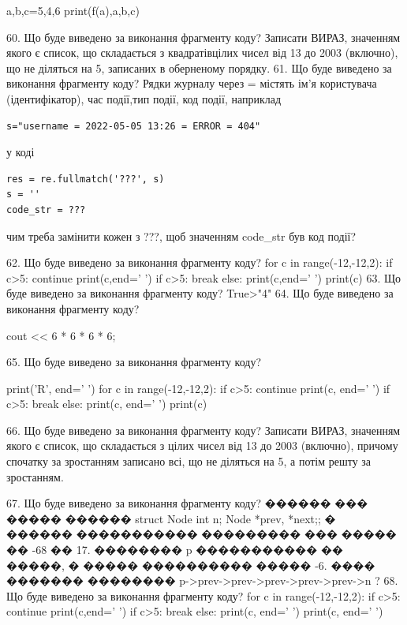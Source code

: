 \documentclass[11pt]{article}
\begin{document}
a,b,c=5,4,6
print(f(a),a,b,c)

60. Що буде виведено за виконання фрагменту коду?
Записати ВИРАЗ, значенням якого є список, що складається з квадратівцілих чисел від 13 до 2003 (включно), що не діляться на 5, записаних в оберненому порядку.
61. Що буде виведено за виконання фрагменту коду?
Рядки журналу через = містять ім'я користувача (ідентифікатор), час події,тип події, код події, наприклад
\begin{verbatim}
s="username = 2022-05-05 13:26 = ERROR = 404"
\end{verbatim}
у коді 
\begin{verbatim}
res = re.fullmatch('???', s) 
s = ''
code_str = ??? 
\end{verbatim}
чим треба замінити кожен з ???, щоб значенням code\_str був код події? 



62. Що буде виведено за виконання фрагменту коду?
for c in range(-12,-12,2):
     if c>5: continue
     print(c,end=' ')
     if c>5: break
   else: print(c,end=' ')
   print(c)
63. Що буде виведено за виконання фрагменту коду?
True>"4"
64. Що буде виведено за виконання фрагменту коду?

cout << 6 * 6 * 6 * 6;

65. Що буде виведено за виконання фрагменту коду?

print('R', end=' ')
for c in range(-12,-12,2):
    if c>5:
        continue
        print(c, end=' ')
    if c>5:
        break
    else:
        print(c, end=' ')
    print(c)

66. Що буде виведено за виконання фрагменту коду?
Записати ВИРАЗ, значенням якого є список, що складається з цілих чисел від 13 до 2003 (включно), причому спочатку за зростанням записано всі, що не діляться на 5, а потім решту за зростанням.

67. Що буде виведено за виконання фрагменту коду?
������ ��� ����� ������ struct Node {int n; Node *prev, *next;};
� ������ ����������� ��������� ��� ����� �� -68 �� 17. �������� p ����������� �� �����, � ����� ���������� ����� -6.
���� ������� �������� p->prev->prev->prev->prev->prev->n ?
68. Що буде виведено за виконання фрагменту коду?
for c in range(-12,-12,2):
    if c>5:
        continue
        print(c,end=' ')
    if c>5:
        break
else:
    print(c, end=' ')
print(c, end=' ')
\end{document}
